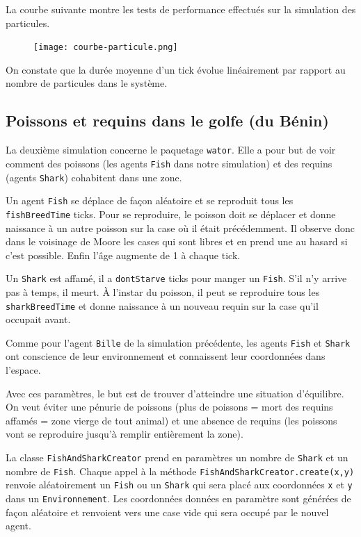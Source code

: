 \documentclass[a4paper]{article}
\begin{document}
La courbe suivante montre les tests de performance effectués sur la simulation des particules.

\begin{figure}[!h]
\centering
\texttt{[image: courbe-particule.png]}
\end{figure}

On constate que la durée moyenne d'un tick évolue linéairement par rapport au nombre de particules dans le système.
\newpage

\subsection{Poissons et requins dans le golfe (du Bénin)}
La deuxième simulation concerne le paquetage \texttt{wator}. Elle a pour but de voir comment des poissons (les agents \texttt{Fish} dans notre simulation) et des requins (agents \texttt{Shark}) cohabitent dans une zone. 

\medskip
Un agent \texttt{Fish} se déplace de façon aléatoire et se reproduit tous les \texttt{fishBreedTime} ticks. Pour se reproduire, le poisson doit se déplacer et donne naissance à un autre poisson sur la case où il était précédemment. Il observe donc dans le voisinage de Moore les cases qui sont libres et en prend une au hasard si c'est possible. Enfin l'âge augmente de 1 à chaque tick.

\medskip
Un \texttt{Shark} est affamé, il a \texttt{dontStarve} ticks pour manger un \texttt{Fish}. S'il n'y arrive pas à temps, il meurt. À l'instar du poisson, il peut se reproduire tous les \texttt{sharkBreedTime} et donne naissance à un nouveau requin sur la case qu'il occupait avant.

\medskip
Comme pour l'agent \texttt{Bille} de la simulation précédente, les agents \texttt{Fish} et \texttt{Shark} ont conscience de leur environnement et connaissent leur coordonnées dans l'espace.

\medskip
Avec ces paramètres, le but est de trouver d'atteindre une situation d'équilibre. On veut éviter une pénurie de poissons (plus de poissons = mort des requins affamés = zone vierge de tout animal) et une absence de requins (les poissons vont se reproduire jusqu'à remplir entièrement la zone).

\medskip
La classe \texttt{FishAndSharkCreator} prend en paramètres un nombre de \texttt{Shark} et un nombre de \texttt{Fish}. Chaque appel à la méthode \texttt{FishAndSharkCreator.create(x,y)} renvoie aléatoirement un \texttt{Fish} ou un \texttt{Shark} qui sera placé aux coordonnées \texttt{x} et \texttt{y} dans un \texttt{Environnement}. Les coordonnées données en paramètre sont générées de façon aléatoire et renvoient vers une case vide qui sera occupé par le nouvel agent.
\newpage 
\end{document}
